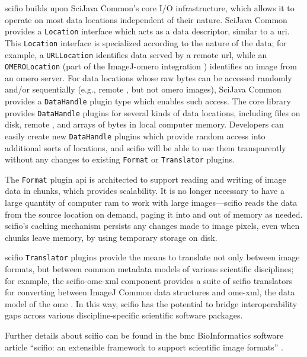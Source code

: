 \documentclass{bmcart}
\begin{document}
\acrshort{scifio} builds upon SciJava Common's core I/O infrastructure, which
allows it to operate on most data locations independent of their nature.
SciJava Common provides a \texttt{Location} interface which acts as a data
descriptor, similar to a \acrfull{uri}. This \texttt{Location} interface is
specialized according to the nature of the data; for example, a
\texttt{URLLocation} identifies data served by a remote \acrshort{url}, while
an \texttt{OMEROLocation} (part of the ImageJ-\acrshort{omero} integration
\cite{imagej_omero}) identifies an image from an \acrshort{omero} server. For
data locations whose raw bytes can be accessed randomly and/or sequentially
(e.g., remote , but not \acrshort{omero} images), SciJava
Common provides a \texttt{DataHandle} plugin type which enables such access.
The core library provides \texttt{DataHandle} plugins for several kinds of data
locations, including files on disk, remote , and arrays of
bytes in local computer memory. Developers can easily create new
\texttt{DataHandle} plugins which provide random access into additional sorts
of locations, and \acrshort{scifio} will be able to use them transparently
without any changes to existing \texttt{Format} or \texttt{Translator} plugins.

The \texttt{Format} plugin \acrshort{api} is architected to support reading and
writing of image data in chunks, which provides scalability. It is no longer
necessary to have a large quantity of computer \acrshort{ram} to work with
large images---\acrshort{scifio} reads the data from the source location on
demand, paging it into and out of memory as needed. \acrshort{scifio}'s caching
mechanism persists any changes made to image pixels, even when chunks leave
memory, by using temporary storage on disk.

\acrshort{scifio} \texttt{Translator} plugins provide the means to translate
not only between image formats, but between common metadata models of various
scientific disciplines; for example, the
\acrshort{scifio}-\acrshort{ome}-\acrshort{xml} component provides a suite of
\acrshort{scifio} translators for converting between ImageJ Common data
structures and \acrshort{ome}-\acrshort{xml}, the data model of the
\acrfull{ome} \cite{ome_xml}. In this way, \acrshort{scifio} has the potential
to bridge interoperability gaps across various discipline-specific scientific
software packages.

Further details about \acrshort{scifio} can be found in the \acrshort{bmc}
BioInformatics software article ``\acrshort{scifio}: an extensible framework to
support scientific image formats'' \cite{scifio}.
\end{document}

